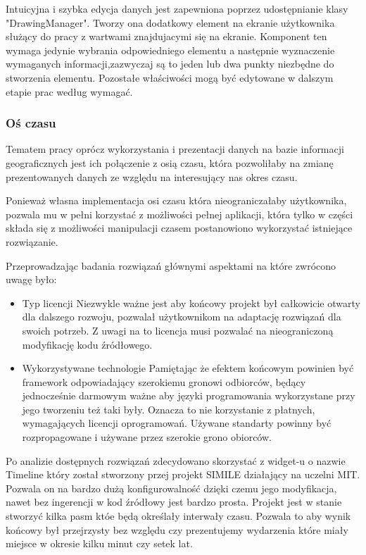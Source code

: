 Intuicyjna i szybka edycja danych jest zapewniona poprzez udostępnianie klasy "DrawingManager". Tworzy ona dodatkowy element na ekranie użytkownika służący do pracy z wartwami znajdujacymi się na ekranie. Komponent ten wymaga jedynie wybrania odpowiedniego elementu a następnie wyznaczenie wymaganych informacji,zazwyczaj są to jeden lub dwa punkty niezbędne do stworzenia elementu. Pozostałe właściwości mogą być edytowane w dalszym etapie prac według wymagać.


\subsubsection{Oś czasu}
\label{subsubsec:os}

Tematem pracy oprócz wykorzystania i prezentacji danych na bazie informacji geograficznych jest ich połączenie z osią czasu, która pozwoliłaby na zmianę prezentowanych danych ze względu na interesujący nas okres czasu.

Ponieważ własna implementacja osi czasu która nieograniczałaby użytkownika, pozwala mu w pełni korzystać z możliwości pełnej aplikacji, która tylko w części składa się z możliwości manipulacji czasem postanowiono wykorzystać istniejące rozwiązanie.

Przeprowadzając badania rozwiązań głównymi aspektami na które zwrócono uwagę było:


\begin{itemize}

\item

Typ licencji
Niezwykle ważne jest aby końcowy projekt był całkowicie otwarty dla dalszego rozwoju, pozwalał użytkownikom na adaptację rozwiązań dla swoich potrzeb. Z uwagi na to licencja musi pozwalać na nieograniczoną modyfikację kodu źródłowego.

\item

Wykorzystywane technologie
Pamiętając że efektem końcowym powinien być framework odpowiadający szerokiemu gronowi odbiorców, będący jednocześnie darmowym ważne aby języki programowania wykorzystane przy jego tworzeniu też taki były. Oznacza to nie korzystanie z płatnych, wymagających licencji oprogramowań. Używane standarty powinny być rozpropagowane i używane przez szerokie grono obiorców.

\end{itemize}

Po analizie dostępnych rozwiązań zdecydowano skorzystać z widget-u o nazwie Timeline który został stworzony przej projekt SIMILE działający na uczelni MIT. Pozwala on na bardzo dużą konfigurowalność dzięki czemu jego modyfikacja, nawet bez ingerencji w kod źródłowy jest bardzo prosta.
Projekt jest w stanie stworzyć kilka pasm któe będą określały interwały czasu. Pozwala to aby wynik końcowy był przejrzysty bez względu czy prezentujemy wydarzenia które miały miejsce w okresie kilku minut czy setek lat.

